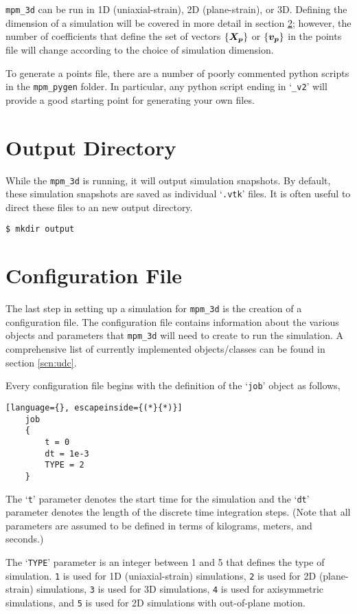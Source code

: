 \texttt{mpm\_3d} can be run in 1D (uniaxial-strain), 2D (plane-strain), or 3D. Defining the dimension of a simulation will be covered in more detail in section \ref{scn:config_file}; however, the number of coefficients that define the set of vectors \(\{\boldsymbol{X_p}\}\) or \(\{\boldsymbol{v_p}\}\) in the points file will change according to the choice of simulation dimension.

To generate a points file, there are a number of poorly commented python scripts in the \texttt{mpm\_pygen} folder. In particular, any python script ending in `\texttt{\_v2}' will provide a good starting point for generating your own files.


\section{Output Directory}
While the \texttt{mpm\_3d} is running, it will output simulation snapshots. By default, these simulation snapshots are saved as individual `\texttt{.vtk}' files. It is often useful to direct these files to an new output directory.

\texttt{\$ mkdir output}


\section{Configuration File} \label{scn:config_file}
The last step in setting up a simulation for \texttt{mpm\_3d} is the creation of a configuration file. The configuration file contains information about the various objects and parameters that \texttt{mpm\_3d} will need to create to run the simulation. A comprehensive list of currently implemented objects/classes can be found in section \ref{scn:udc}.

Every configuration file begins with the definition of the `\texttt{job}' object as follows,
\begin{lstlisting}[language={}, escapeinside={(*}{*)}]
    job
    {
        t = 0
        dt = 1e-3
        TYPE = 2
    }
\end{lstlisting}
The `\texttt{t}' parameter denotes the start time for the simulation and the `\texttt{dt}' parameter denotes the length of the discrete time integration steps. (Note that all parameters are assumed to be defined in terms of kilograms, meters, and seconds.)

The `\texttt{TYPE}' parameter is an integer between 1 and 5 that defines the type of simulation. \texttt{1} is used for 1D (uniaxial-strain) simulations, \texttt{2} is used for 2D (plane-strain) simulations, \texttt{3} is used for 3D simulations, \texttt{4} is used for axisymmetric simulations, and \texttt{5} is used for 2D simulations with out-of-plane motion.

